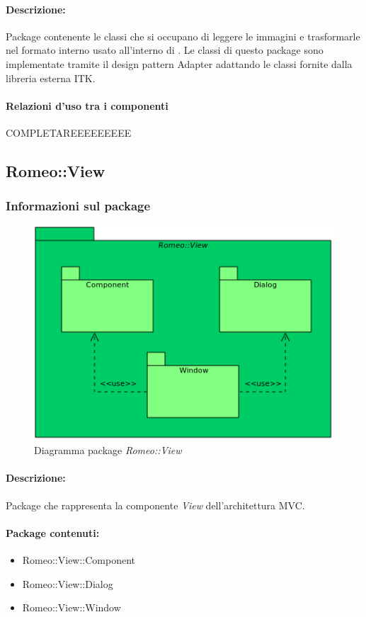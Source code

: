 			\paragraph{Descrizione:}Package\g{} contenente le classi che si occupano di leggere le immagini e trasformarle nel formato interno usato all'interno di \project{}. Le classi di questo package\g{} sono implementate tramite il design pattern\g{} Adapter adattando le classi fornite dalla libreria esterna ITK\g{}.
			\paragraph{Relazioni d'uso tra i componenti}
COMPLETAREEEEEEEEE	\subsection{Romeo::View}
		\subsubsection{Informazioni sul package}
			\begin{figure}[!h]
				\centering
				\includegraphics[scale=0.5]{./Content/Immagini/Romeo__View.png}
				\caption{Diagramma package \textsl{Romeo::View}}
			\end{figure}
			\paragraph{Descrizione:}Package\g{} che rappresenta la componente \textsl{View} dell'architettura MVC\g{}.
			\paragraph{Package contenuti:}
				\begin{itemize}
					\item Romeo::View::Component
					\item Romeo::View::Dialog
					\item Romeo::View::Window
				\end{itemize}
